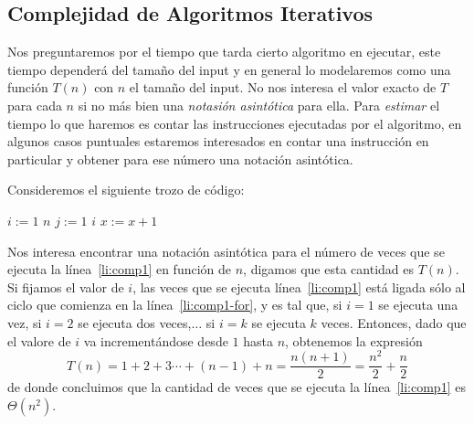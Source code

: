 \subsection{Complejidad de Algoritmos Iterativos}

Nos preguntaremos por el tiempo que tarda cierto algoritmo en ejecutar, este tiempo dependerá del tamaño del input y en general lo modelaremos como una función $T(n)$ con $n$ el tamaño del input.
No nos interesa el valor exacto de $T$ para cada $n$ si no más bien una \emph{notasión asintótica} para ella.
Para \emph{estimar} el tiempo lo que haremos es contar las instrucciones ejecutadas por el algoritmo, en algunos casos puntuales estaremos interesados en contar una instrucción en particular y obtener para ese número una notación asintótica.

\begin{ejemplo}
Consideremos el siguiente trozo de código:
\begin{codebox}
\li \For $i:=1$ \To $n$
\li \> \For $j:=1$ \To $i$ \label{li:comp1-for}
\li \> \> $x:=x+1$ \label{li:comp1}
\end{codebox}
Nos interesa encontrar una notación asintótica para el número de veces que se ejecuta la línea~\ref{li:comp1} en función de $n$, digamos que esta cantidad es $T(n)$.
Si fijamos el valor de $i$, las veces que se ejecuta línea~\ref{li:comp1} está ligada sólo al ciclo que comienza en la línea~\ref{li:comp1-for}, y es tal que, si $i=1$ se ejecuta una vez, si $i=2$ se ejecuta dos veces,$\ldots$ si $i=k$ se ejecuta $k$ veces.
Entonces, dado que el valore de $i$ va incrementándose desde $1$ hasta $n$, obtenemos la expresión
\[
T(n)=1+2+3\cdots +(n-1)+n=\frac{n(n+1)}{2}=\frac{n^2}{2}+\frac{n}{2}
\]
de donde concluimos que la cantidad de veces que se ejecuta la línea~\ref{li:comp1} es $\Theta(n^2)$.
\end{ejemplo}

